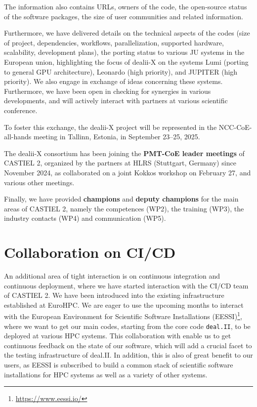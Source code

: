 \documentclass[a4paper,12pt]{article}
\begin{document}
The information also contains URLs, owners of the code, the open-source status
of the software packages, the size of user communities and related
information.

Furthermore, we have delivered details on the technical aspects of the codes
(size of project, dependencies, workflows, parallelization, supported
hardware, scalability, development plans), the porting status to various JU
systems in the European union, highlighting the focus of dealii-X on the
systems Lumi (porting to general GPU architecture), Leonardo (high priority),
and JUPITER (high priority). We also engage in exchange of ideas concerning
these systems. Furthermore, we have been open in checking for synergies in
various developments, and will actively interact with partners at various
scientific conference.

To foster this exchange, the dealii-X project will be represented in the
NCC-CoE-all-hands meeting in Tallinn, Estonia, in September 23--25, 2025.

The dealii-X consortium has been joining the \textbf{PMT-CoE leader meetings}
of CASTIEL 2, organized by the partners at HLRS (Stuttgart, Germany) since
November 2024, as collaborated on a joint Kokkos workshop on February 27, and
various other meetings.

Finally, we have provided \textbf{champions} and \textbf{deputy champions} for
the main areas of CASTIEL 2, namely the competences (WP2), the training (WP3),
the industry contacts (WP4) and communication (WP5).

\section{Collaboration on CI/CD}

An additional area of tight interaction is on continuous integration and
continuous deployment, where we have started interaction with the CI/CD team
of CASTIEL 2. We have been introduced into the existing infrastructure
established at EuroHPC. We are eager to use the upcoming months to interact
with the European Environment for Scientific Software Installations
(EESSI)\footnote{\url{https://www.eessi.io/}}, where we want to get our main
codes, starting from the core code \texttt{deal.II}, to be deployed at various
HPC systems. This collaboration with enable us to get continuous feedback on
the state of our software, which will add a crucial facet to the testing
infrastructure of deal.II. In addition, this is also of great benefit to our
users, as EESSI is subscribed to build a common stack of scientific software
installations for HPC systems as well as a variety of other systems.
\end{document}
